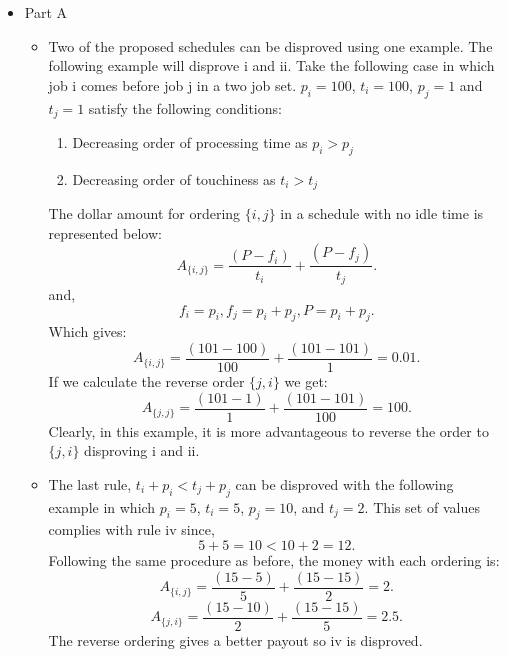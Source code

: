\documentclass[letterpaper,11pt]{article}
\begin{document}
\begin{enumerate}
  
  \newpage
  \begin{itemize}
      \color{teal}
      \item Part A
  \begin{itemize}
      \item Two of the proposed schedules can be disproved using one example.
           The following example will disprove i and ii. 
          Take the following case in which job i comes before job j in a two
          job set. $p_i = 100$,  $t_i = 100$, $p_j = 1$ and $t_j = 1$ satisfy 
          the following conditions:
          \begin{enumerate}[i]
              \item Decreasing order of processing time as $p_i > p_j$
              \item Decreasing order of touchiness as $t_i > t_j$
          \end{enumerate}
          The dollar amount for ordering $\{i, j\} $ in a schedule with no idle 
          time is represented below:
          \[
              A_{\{i, j\} } = \frac{\left( P - f_i \right) }{t_i} + \frac{\left( P - f_j \right) }{t_j}
          .\] 
          and, 
          \[
          f_i = p_i, f_j = p_i + p_j, P = p_i + p_j
          .\] 
          Which gives:
          \[
              A_{\{i, j\} } = \frac{\left( 101 - 100 \right) }{100} + \frac{\left( 101 - 101 \right) }{1} = 0.01
          .\] 
          If we calculate the reverse order $\{j, i\} $ we get:
          \[
              A_{\{j, j\} } = \frac{\left( 101-1 \right) }{1} + \frac{\left( 101 - 101 \right) }{100} = 100
          .\] 
          Clearly, in this example, it is more advantageous to reverse the order
          to $\{j, i\} $ disproving i and ii.
      \item The last rule, $t_i + p_i < t_j + p_j$ can be disproved with the 
          following example in which $p_i = 5$,  $t_i = 5$, $p_j = 10$, and $t_j = 2$. This set of values complies with rule iv since,
          \[
          5 + 5 = 10 < 10 + 2 = 12
          .\] 
          Following the same procedure as before, the money with each ordering 
          is:
          \[
              A_{\{i, j\} } = \frac{\left( 15 - 5 \right) }{5} + \frac{\left( 15 - 15 \right) }{2} = 2
          .\] 
          \[
              A_{\{j, i\} } = \frac{\left( 15 - 10 \right) }{2} + \frac{\left( 15 -15 \right) }{5} = 2.5
          .\] 
          The reverse ordering gives a better payout so iv is disproved.

  \end{itemize}


\end{itemize}
\end{enumerate}
\end{document}
